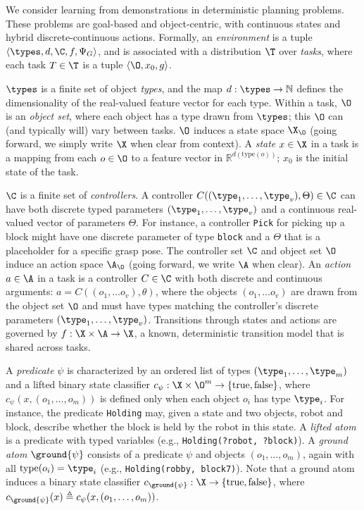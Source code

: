 We consider learning from demonstrations in deterministic planning problems.
These problems are goal-based and object-centric, with continuous states and hybrid discrete-continuous actions.
Formally, an \emph{environment} is a tuple $\langle \types, d, \C, f, \Psi_G \rangle$, and is associated with a distribution $\T$ over \emph{tasks}, where each task $T \in \T$ is a tuple $\langle \O, x_0, g \rangle$.

$\types$ is a finite set of object \emph{types}, and the map $d: \types \to \mathbb{N}$ defines the dimensionality of the real-valued feature vector for each type. Within a task, $\O$ is an \emph{object set}, where each object has a type drawn from $\types$; this $\O$ can (and typically will) vary between tasks.
$\O$ induces a state space $\X_\O$ (going forward, we simply write $\X$ when clear from context). A \emph{state} $x \in \X$ in a task is a mapping from each $o \in \O$ to a feature vector in $\mathbb{R}^{d(\text{type}(o))}$; $x_0$ is the initial state of the task.

$\C$ is a finite set of \emph{controllers}. A controller $C((\type_1, \dots, \type_v), \Theta) \in \C$ can have both discrete typed parameters $(\type_1, \ldots, \type_v)$ and a continuous real-valued vector of parameters $\Theta$. For instance, a controller \texttt{Pick} for picking up a block might have one discrete parameter of type \texttt{block} and a $\Theta$ that is a placeholder for a specific grasp pose. The controller set $\C$ and object set $\O$ induce an action space $\A_\O$ (going forward, we write $\A$ when clear). An \emph{action} $a \in \A$ in a task is a controller $C \in \C$ with both discrete and continuous arguments: $a = C((o_1, \ldots o_v), \theta)$, where the objects $(o_1, \ldots o_v)$ are drawn from the object set $\O$ and must have types matching the controller's discrete parameters $(\type_1, \ldots, \type_v)$. 
Transitions through states and actions are governed by $f: \X \times \A \to \X$, a known, deterministic transition model that is shared across tasks.

A \emph{predicate} $\psi$ is characterized by an ordered list of types $(\type_1, \dots, \type_m)$ and a lifted binary state classifier $c_\psi : \X \times \O^m \to \{\text{true}, \text{false}\}$, where $c_\psi(x, (o_1, \dots, o_m))$ is defined only when each object $o_i$ has type $\type_i$.
For instance, the predicate \mbox{\texttt{Holding}} may, given a state and two objects, robot and block, describe whether the block is held by the robot in this state.
A \emph{lifted atom} is a predicate with typed variables (e.g., \texttt{Holding(?robot, ?block)}).
A \emph{ground atom} $\ground{\psi}$ consists of a predicate $\psi$ and objects $(o_1, \dots, o_m)$, again with all $\text{type}(o_i) = \type_i$ (e.g., \texttt{Holding(robby, block7)}).
Note that a ground atom induces a binary state classifier $c_{\ground{\psi}} : \X \to \{\text{true}, \text{false}\}$, where $c_{\ground{\psi}}(x) \triangleq c_{\psi}(x, (o_1, \dots, o_m))$.

